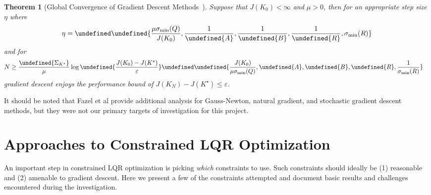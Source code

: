\documentclass[11pt]{article}  %
\newtheorem{theorem}{Theorem}
\let\parens\undefined
\newcommand{\parens}[1]{\left(#1\right)}
\let\norm\undefined
\newcommand{\norm}[1]{\lVert #1 \rVert}
\let\poly\undefined
\DeclareMathOperator{\poly}{poly}
\begin{document}
\begin{theorem}[Global Convergence of Gradient Descent Methods~\cite{fazel2018global}]
  Suppose that \(J(K_0) < \infty\) and \(\mu > 0\),
  then for an appropriate step size \(\eta\) where
  \begin{align}
    \eta = \poly \parens{
        \frac{\mu \sigma_{\min} (Q)}{J(K_0)},
        \frac{1}{\norm{A}},
        \frac{1}{\norm{B}},
        \frac{1}{\norm{R}},
        \sigma_{\min} (R)}
  \end{align}
  and for
  \begin{align}
    N &\geq \frac{\norm{\Sigma_{K^\star}}}{\mu}
          \log\parens{\frac{J(K_0) - J(K^\star)}{\varepsilon}}
          \poly\parens{\frac{J(K_0)}{\mu \sigma_{\min} (Q)},
            \norm{A}, \norm{B}, \norm{R}, \frac{1}{\sigma_{\min} (R)}}
  \end{align}
  gradient descent enjoys the performance bound of
  \(J(K_N) - J(K^\star) \leq \varepsilon\).
\end{theorem}

It should be noted that Fazel et al provide additional analysis
for Gauss-Newton, natural gradient, and stochastic gradient descent methods,
but they were not our primary targets of investigation for this project.



\section{Approaches to Constrained LQR Optimization}
\label{sec:approaches}

An important step in constrained LQR optimization is picking
\textit{which} constraints to use.
Such constraints should ideally
be (1) reasonable and (2) amenable to gradient descent.
Here we present a few of the constraints attempted
and document basic results and challenges encountered during the investigation.
\end{document}
